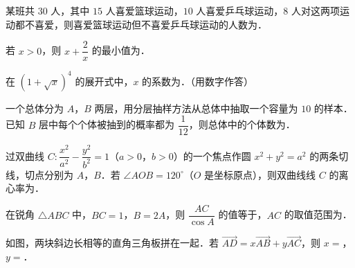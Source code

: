\begin{question}
某班共 $30$ 人，其中 $15$ 人喜爱篮球运动，$10$ 人喜爱乒乓球运动，$8$ 人对这两项运动都不喜爱，则喜爱篮球运动但不喜爱乒乓球运动的人数为\gkblank{}．

\end{question}
\begin{question}
若 $x>0$，则 $x+\dfrac2x$ 的最小值为\gkblank{}．

\end{question}
\begin{question}
在 $(1+\sqrt x)^4$ 的展开式中，$x$ 的系数为\gkblank{}．（用数字作答）

\end{question}
\begin{question}
一个总体分为 $A$，$B$ 两层，用分层抽样方法从总体中抽取一个容量为 $10$ 的样本．已知 $B$ 层中每个个体被抽到的概率都为 $\dfrac1{12}$，则总体中的个体数为\gkblank{}．

\end{question}
\begin{question}
过双曲线 $C:\dfrac{x^2}{a^2}-\dfrac{y^2}{b^2}=1$（$a>0$，$b>0$）的一个焦点作圆 $x^2+y^2=a^2$ 的两条切线，切点分别为 $A$，$B$．若 $\angle AOB=120^\circ$（$O$ 是坐标原点），则双曲线线 $C$ 的离心率为\gkblank{}．

\end{question}
\begin{question}
在锐角 $\triangle ABC$ 中，$BC=1$，$B=2A$，则 $\dfrac{AC}{\cos A}$ 的值等于\gkblank{}，$AC$ 的取值范围为\gkblank{}．

\Needspace{0.4\textheight}
\end{question}
\begingroup
\renewenvironment{question}{\Needspace{0.5\textheight}}{}
\begin{question}
如图，两块斜边长相等的直角三角板拼在一起．若 $\overrightarrow{AD}=x\overrightarrow{AB}+y\overrightarrow{AC}$，则 $x=$\gkblank{}，$y=$\gkblank{}．
\nopagebreak[4]
\begin{center}\end{center}
\nopagebreak[4]
\end{question}
\endgroup
{}


